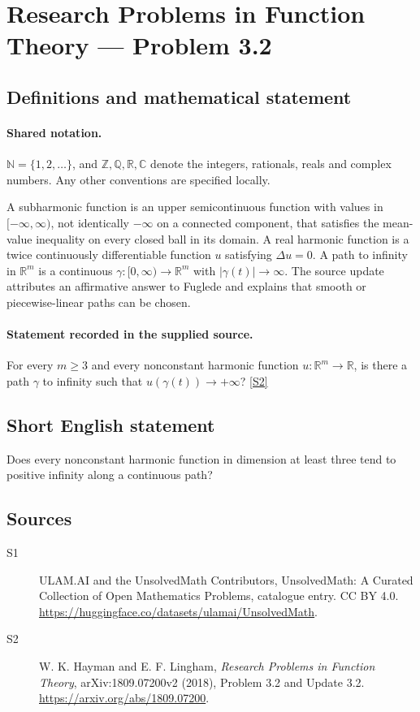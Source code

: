\documentclass[11pt]{article}
\newcommand{\sref}[2]{\hyperlink{source:#1:#2}{[S#2]}}
\begin{document}
\section{Research Problems in Function Theory — Problem 3.2}\label{statement}

\subsection{Definitions and mathematical statement}

\paragraph{Shared notation.}$\mathbb N=\{1,2,\ldots\}$, and $\mathbb Z,\mathbb Q,\mathbb R,\mathbb C$ denote the integers, rationals, reals and complex numbers. Any other conventions are specified locally.


A subharmonic function is an upper semicontinuous function with values in $[-\infty,\infty)$, not identically $-\infty$ on a connected component, that satisfies the mean-value inequality on every closed ball in its domain. A real harmonic function is a twice continuously differentiable function $u$ satisfying $\Delta u=0$. A path to infinity in $\mathbb R^m$ is a continuous $\gamma:[0,\infty)\to\mathbb R^m$ with $|\gamma(t)|\to\infty$.
The source update attributes an affirmative answer to Fuglede and explains that smooth or piecewise-linear paths can be chosen.
\paragraph{Statement recorded in the supplied source.}
For every $m\geq3$ and every nonconstant harmonic function $u:\mathbb R^m\to\mathbb R$, is there a path $\gamma$ to infinity such that $u(\gamma(t))\to+\infty$? \sref{statement}{2}
\subsection{Short English statement}
Does every nonconstant harmonic function in dimension at least three tend to positive infinity along a continuous path?
\subsection{Sources}
\begin{description}
\item[\hypertarget{source:statement:1}{S1}] ULAM.AI and the UnsolvedMath Contributors, UnsolvedMath: A Curated Collection of Open Mathematics Problems, catalogue entry. CC BY 4.0. \url{https://huggingface.co/datasets/ulamai/UnsolvedMath}.
\item[\hypertarget{source:statement:2}{S2}] W. K. Hayman and E. F. Lingham, \emph{Research Problems in Function Theory}, arXiv:1809.07200v2 (2018), Problem 3.2 and Update 3.2. \url{https://arxiv.org/abs/1809.07200}.
\end{description}
\label{end:statement}
\end{document}

